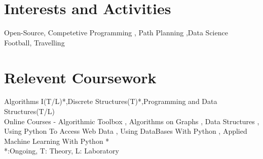 \documentclass[a4paper,10pt]{article}
\begin{document}
\section{Interests and Activities}
Open-Source, Competetive Programming , 
Path Planning ,Data Science \\
Football, Travelling

\section{Relevent Coursework}
Algorithms I(T/L)*,Discrete Structures(T)*,Programming and Data Structures(T/L)\\
Online Courses - Algorithmic Toolbox , Algorithms on Graphs , Data Structures ,\\Using Python To Access Web Data ,  
Using DataBases With Python , Applied Machine Learning With Python *\\
*:Ongoing, T: Theory, L: Laboratory

\end{document}
